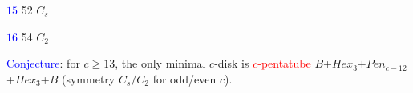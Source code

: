 \documentclass{beamer}
\begin{document}
\begin{frame}
\begin{center}
\begin{minipage}[b]{26mm}
\centering
{}\par
\textcolor{blue}{$15$} 52 $C_{s}$
\end{minipage}
\begin{minipage}[b]{26mm}
\centering
{}\par
\textcolor{blue}{$16$} 54 $C_{2}$
\end{minipage}   
\end{center} 
\vspace{-2mm}    
\textcolor{blue}{Conjecture}: for $c\ge 13$, the only
minimal $c$-disk  is \textcolor{red}{$c$-pentatube}
$B$+$Hex_3$$+$$Pen_{c-12}$+$Hex_3$+$B$ (symmetry $C_s/C_2$ for odd/even
$c$).


\end{frame}
\end{document}
